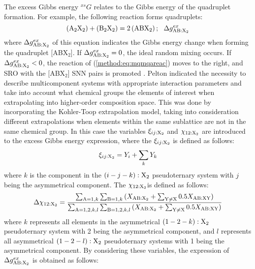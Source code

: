 The excess Gibbs energy $^{xs}G$ relates to the Gibbs energy of the quadruplet formation. For example, the following reaction forms quadruplets:
\begin{equation} \label{method:eq:mqmqareac}
    \left({\rm A_2X_2}\right)+\left({\rm B_2X_2}\right)=2\left({\rm ABX_2}\right);\:\:\:\mathrm{\Delta}g_{\rm AB:X_2}^{ex}
\end{equation}
where ${\Delta}g_{\rm AB:X_2}^{ex}$ of this equation indicates the Gibbs energy change when forming the quadruplet [ABX$_2$]. If ${\Delta}g_{\rm AB:X_2}^{ex}=0$, the ideal random mixing occurs. If ${\Delta}g_{\rm AB:X_2}^{ex}<0$, the reaction of (\ref{method:eq:mqmqareac}) moves to the right, and SRO with the [ABX$_2$] SNN pairs is promoted \cite{pelton2018phase}. Pelton \cite{pelton2018phase} indicated the necessity to describe multicomponent systems with appropriate interaction parameters and take into account what chemical groups the elements of interest when extrapolating into higher-order composition space. This was done by incorporating the Kohler-Toop extrapolation model, taking into consideration different extrapolations when elements within the same sublattice are not in the same chemical group. In this case the variables $\xi_{ij:{\rm X}_2}$ and $\chi_{12:{\rm X}_2}$ are introduced to the excess Gibbs energy expression, where the $\xi_{ij:{\rm X}_2}$ is defined as follows:
\begin{equation} \label{method:eq:mqmqaxi}
    \xi_{ij:{\rm X}_2}=Y_i+\sum_{k}Y_k
\end{equation}
where $k$ is the component in the $(i-j-k):{\rm X}_2$ pseudoternary system with $j$ being the asymmetrical component. The $\chi_{12:{\rm X}_2}$is defined as follows:
\begin{equation} \label{method:eq:mqmqachi}
    \Delta \chi_{12:{\rm X}_2}=\frac{\sum_{{\rm A}=1,k}\sum_{{\rm B}=1,k}{(X_{\rm AB:X_2}+\sum_{\rm Y\neq X}{0.5X_{\rm AB:XY})}}}{\sum_{{\rm A}=1,2,k,l}\sum_{{\rm B}=1,2,k,l}{(X_{\rm AB:X_2}+\sum_{\rm Y\neq X}{0.5X_{\rm AB:XY})}}}
\end{equation}
where $k$ represents all elements in the asymmetrical $(1-2-k):{\rm X}_2$ pseudoternary system with 2 being the asymmetrical component, and $l$ represents all asymmetrical $(1-2-l):{\rm X}_2$ pseudoternary systems with 1 being the asymmetrical component. By considering these variables, the expression of ${\Delta}g_{\rm AB:X_2}^{ex}$ is obtained as follows:
